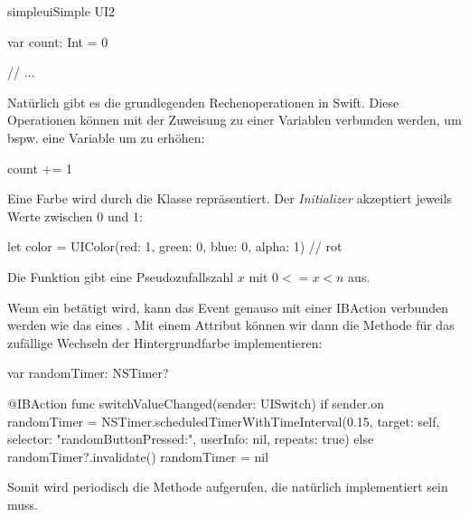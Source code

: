 \documentclass[parskip=half, final]{scrreprt}
\begin{document}
\begin{lecture}
\begin{exc}
\begin{excitem}{simpleui}{Simple UI}{2}
\begin{exchinweise}
\begin{swiftcode}
{    var count: Int = 0
    
    // ...
}
\end{swiftcode}
\item Natürlich gibt es die grundlegenden Rechenoperationen \swiftinline{+-*/} in Swift. Diese Operationen können mit der Zuweisung zu einer Variablen verbunden werden, um bspw. eine Variable  um  zu erhöhen:
\begin{swiftcode}
count += 1
\end{swiftcode}
\item Eine Farbe wird durch die Klasse  repräsentiert. Der \emph{Initializer}  akzeptiert jeweils Werte zwischen 0 und 1:
\begin{swiftcode}
let color = UIColor(red: 1, green: 0, blue: 0, alpha: 1) // rot
\end{swiftcode}
\item Die Funktion  gibt eine Pseudozufallszahl $x$ mit $0<=x<n$ aus.
\item Wenn ein  betätigt wird, kann das Event genauso mit einer IBAction verbunden werden wie das eines . Mit einem Attribut  können wir dann die Methode für das zufällige Wechseln der Hintergrundfarbe implementieren:
\begin{swiftcode}
var randomTimer: NSTimer?

@IBAction func switchValueChanged(sender: UISwitch) {
    if sender.on {
        randomTimer = NSTimer.scheduledTimerWithTimeInterval(0.15, target: self, selector: "randomButtonPressed:", userInfo: nil, repeats: true)
    } else {
        randomTimer?.invalidate()
        randomTimer = nil
    }
}
\end{swiftcode}
	Somit wird periodisch die Methode  aufgerufen, die natürlich implementiert sein muss.

\end{exchinweise}

\end{excitem}

\end{exc}


\end{lecture}
\end{document}
